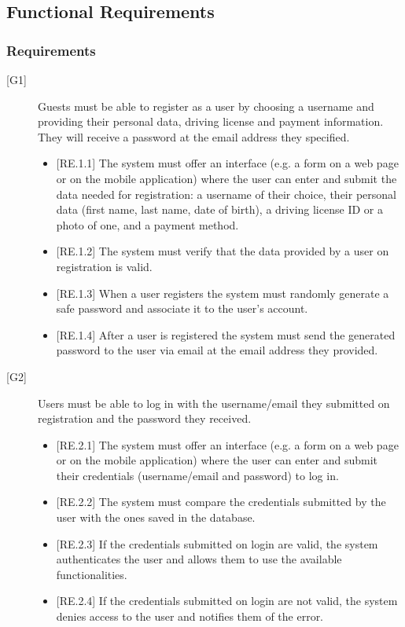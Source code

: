 \documentclass[english]{article}
\begin{document}
\subsection{Functional Requirements}

\subsubsection{Requirements}


\begin{description}

\item[{[G1]}]{Guests must be able to register as a user by choosing a username and providing their personal data, driving license and payment information. They will receive a password at the email address they specified.

\begin{itemize}
\item{[RE.1.1] The system must offer an interface (e.g. a form on a web page or on the mobile application) where the user can enter and submit the data needed for registration:
a username of their choice, their personal data (first name, last name, date of birth), a driving license ID or a photo of one, and a payment method.}
\item{[RE.1.2] The system must verify that the data provided by a user on registration is valid.}
\item{[RE.1.3] When a user registers the system must randomly generate a safe password and associate it to the user’s account.}
\item{[RE.1.4] After a user is registered the system must send the generated password to the user via email at the email address they provided.}
\end{itemize}
}

\item[{[G2]}]{Users must be able to log in with the username/email they submitted on registration and the password they received.
\begin{itemize}
	\item{[RE.2.1] The system must offer an interface (e.g. a form on a web page or on the mobile application) where the user can enter and submit their credentials (username/email and password) to log in.}
	\item{[RE.2.2] The system must compare the credentials submitted by the user with the ones saved in the database.}
	\item{[RE.2.3] If the credentials submitted on login are valid, the system authenticates the user and allows them to use the available functionalities.}
	\item{[RE.2.4] If the credentials submitted on login are not valid, the system denies access to the user and notifies them of the error.}
\end{itemize}
}


\end{description}
\end{document}
